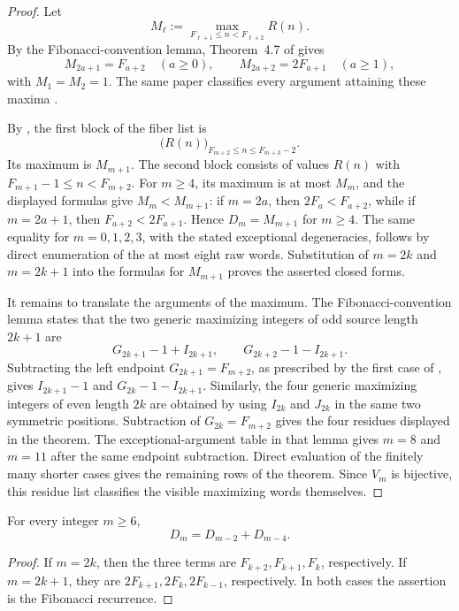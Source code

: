 \begin{proof}
Let
\[
 M_\ell:=\max_{F_{\ell+1}\le n<F_{\ell+2}}R(n).
\]
By the Fibonacci-convention lemma, Theorem~4.7 of
\cite{KocabovaMasakovaPelantova2005} gives
\[
 M_{2a+1}=F_{a+2}\quad(a\ge0),
 \qquad
 M_{2a+2}=2F_{a+1}\quad(a\ge1),
\]
with \(M_1=M_2=1\).
The same paper classifies every argument attaining these maxima
\cite[Thm.~5.3]{KocabovaMasakovaPelantova2005}.

By , the first block of the fiber list is
\[
 \bigl(R(n)\bigr)_{F_{m+2}\le n\le F_{m+3}-2}.
\]
Its maximum is \(M_{m+1}\).  The second block consists of values \(R(n)\) with
\(F_{m+1}-1\le n<F_{m+2}\).  For \(m\ge4\), its maximum is at most \(M_m\), and
the displayed formulas give \(M_m<M_{m+1}\): if \(m=2a\), then
\(2F_a<F_{a+2}\), while if \(m=2a+1\), then
\(F_{a+2}<2F_{a+1}\).  Hence \(D_m=M_{m+1}\) for \(m\ge4\).  The same equality
for \(m=0,1,2,3\), with the stated exceptional degeneracies, follows by direct
enumeration of the at most eight raw words.  Substitution of \(m=2k\) and
\(m=2k+1\) into the formulas for \(M_{m+1}\) proves the asserted closed forms.

It remains to translate the arguments of the maximum.  The
Fibonacci-convention lemma states that the two generic maximizing integers of
odd source length \(2k+1\) are
\[
 G_{2k+1}-1+I_{2k+1},
 \qquad
 G_{2k+2}-1-I_{2k+1}.
\]
Subtracting the left endpoint \(G_{2k+1}=F_{m+2}\), as prescribed by the first
case of , gives
\(I_{2k+1}-1\) and \(G_{2k}-1-I_{2k+1}\).  Similarly, the four generic
maximizing integers of even length \(2k\) are obtained by using \(I_{2k}\) and
\(J_{2k}\) in the same two symmetric positions.  Subtraction of
\(G_{2k}=F_{m+2}\) gives the four residues displayed in the theorem.  The
exceptional-argument table in that lemma gives \(m=8\) and \(m=11\) after the
same endpoint subtraction.  Direct evaluation of the finitely many shorter
cases gives the remaining rows of the theorem.  Since \(V_m\) is bijective,
this residue list classifies the visible maximizing words themselves.
\end{proof}

\begin{corollary}
\label{cor:extremal-fiber-recurrence}
For every integer \(m\ge6\),
\[
 D_m=D_{m-2}+D_{m-4}.
\]
\end{corollary}

\begin{proof}
If \(m=2k\), then the three terms are \(F_{k+2},F_{k+1},F_k\), respectively.
If \(m=2k+1\), they are \(2F_{k+1},2F_k,2F_{k-1}\), respectively.  In both
cases the assertion is the Fibonacci recurrence.
\end{proof}


